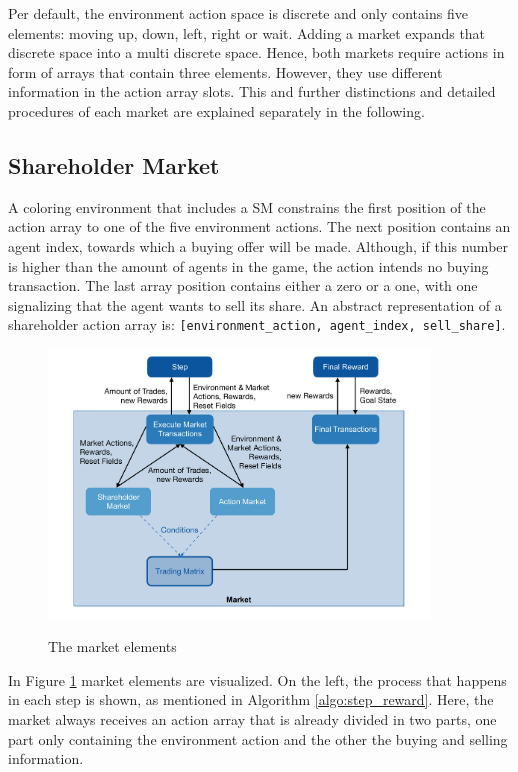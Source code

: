 Per default, the environment action space is discrete and only contains five elements: moving up, down, left, right or wait. Adding a market expands that discrete space into a multi discrete space. Hence, both markets require actions in form of arrays that contain three elements. However, they use different information in the action array slots. This and further distinctions and detailed procedures of each market are explained separately in the following.


\subsection{Shareholder Market}
A coloring environment that includes a SM constrains the first position of the action array to one of the five environment actions. The next position contains an agent index, towards which a buying offer will be made. Although, if this number is higher than the amount of agents in the game, the action intends no buying transaction. The last array position contains either a zero or a one, with one signalizing that the agent wants to sell its share. An abstract representation of a shareholder action array is: \verb|[environment_action, agent_index, sell_share]|.

\begin{figure}[hpbt]
    \centering
    \includegraphics[width=0.9\textwidth]{pictures/market}\\
    \caption[Market Elements]{The market elements}\label{fig:market}
\end{figure}

In Figure \ref{fig:market} market elements are visualized. On the left, the process that happens in each step is shown, as mentioned in Algorithm \ref{algo:step_reward}. Here, the market always receives an action array that is already divided in two parts, one part only containing the environment action and the other the buying and selling information.

